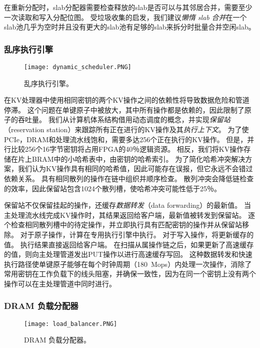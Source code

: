 在重新分配时，slab分配器需要检查释放的slab是否可以与其邻居合并，需要至少一次读取和写入分配位图。
受垃圾收集的启发，我们建议\textit {懒惰 slab 合并}在一个slab池几乎为空时并且没有更大的slab池有足够的slab来拆分时批量合并空闲slab。

\subsubsection{乱序执行引擎}
\label{kvdirect:sec:ooo}

\begin{figure}[t]
\centering
\texttt{[image: dynamic\_scheduler.PNG]}
\caption{乱序执行引擎。}
\label{kvdirect:fig:ooo-mem-access}
\end{figure}

在KV处理器中使用相同密钥的两个KV操作之间的依赖性将导致数据危险和管道停滞。
这个问题在单键原子中被放大，其中所有操作都是依赖的，因此限制了原子的吞吐量。
我们从计算机体系结构借用动态调度的概念，并实现\textit {保留站}（reservation station）来跟踪所有正在进行的KV操作及其\textit {执行上下文}。
为了使PCIe，DRAM和处理流水线饱和，需要多达256个正在执行的KV操作。
但是，并行比较256个16字节密钥将占用FPGA的40％逻辑资源。
相反，我们将KV操作存储在片上BRAM中的小哈希表中，由密钥的哈希索引。
为了简化哈希冲突解决方案，我们认为KV操作具有相同的哈希值，因此可能存在误报，但它永远不会错过依赖关系。
具有相同散列的操作在链中组织并顺序检查。
散列冲突会降低链检查的效率，因此保留站包含1024个散列槽，使哈希冲突可能性低于25％。

保留站不仅保留挂起的操作，还缓存\textit {数据转发}（data forwarding）的最新值。
当主处理流水线完成KV操作时，其结果返回给客户端，最新值被转发到保留站。
逐个检查相同散列槽中的待定操作，并立即执行具有匹配密钥的操作并从保留站移除。
对于原子操作，计算在专用执行引擎中执行。
对于写入操作，将更新缓存的值。
执行结果直接返回给客户端。
在扫描从属操作链之后，如果更新了高速缓存的值，则向主处理管道发出PUT操作以进行高速缓存写回。
这种数据转发和快速执行路径使单键原子能够在每个时钟周期（180~Mops）内处理一次操作，消除了常用密钥在工作负载下的线头阻塞，并确保一致性，因为在同一个密钥上没有两个操作可以在主处理管道中同时进行。


\subsubsection{DRAM 负载分配器}
\label{kvdirect:sec:dram-cache}

\begin{figure}[t]
\centering
\texttt{[image: load\_balancer.PNG]}
\caption{DRAM 负载分配器。}
\label{kvdirect:fig:cache}

\end{figure}

